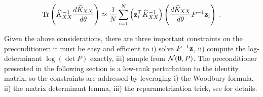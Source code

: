 \documentclass{article}
\begin{document}
\begin{equation*}
    \operatorname{Tr} \left( \widehat K_{XX}^{-1} \frac{d \widehat K_{XX}}{d\theta} \right)
    \approx \frac 1 N \sum_{i=1}^N \left( \boldsymbol{\mathbf{z}}_i^\top \widehat K_{XX}^{-1} \right) \left( \frac{d \widehat K_{XX}}{d\theta} P^{-1} \boldsymbol{\mathbf{z}}_i \right) \; .
\end{equation*}

Given the above considerations, there are three important constraints on the preconditioner: it must be easy and efficient to i) solve $P^{-1} \boldsymbol{\mathbf{z}}$, ii) compute the log-determinant $\log(\det P)$ exactly, iii) sample from $\mathcal N(\boldsymbol{\mathbf{0}}, P)$. The preconditioner presented in the following section is a low-rank perturbation to the identity matrix, so the constraints are addressed by leveraging i) the Woodbury formula, ii) the matrix determinant lemma, iii) the reparametrization trick, see \cite{gardner_gpytorch_2021} for details.
\end{document}

